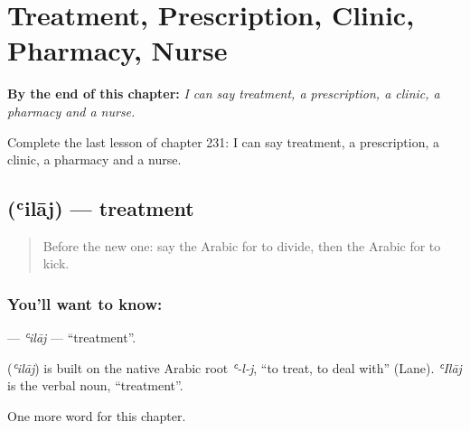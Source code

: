 
\chapter{Treatment, Prescription, Clinic, Pharmacy, Nurse}
\label{ch:ar-treatment-prescription-clinic-pharmacy-nurse}

\begin{chapteropening}
\textbf{By the end of this chapter:} \emph{I can say treatment, a prescription, a clinic, a pharmacy and a nurse.}

Complete the last lesson of chapter 231: I can say treatment, a prescription, a clinic, a pharmacy and a nurse.
\end{chapteropening}

\section[\texorpdfstring{\ar{علاج} (ʿilāj)}{علاج (ʿilāj)}]{ (ʿilāj) — treatment}

\label{lesson:AR-C231-ilaj}



\begin{quote}
Before the new one: say the Arabic for to divide, then the Arabic for to kick.
\end{quote}

\subsection*{You'll want to know: }
\textbf{} — \emph{ʿilāj} — \textquotedblleft{}treatment\textquotedblright{}.

\begin{cousinweb}
\textbf{} (\emph{ʿilāj}) is built on the native Arabic root \emph{ʿ-l-j}, \textquotedblleft{}to treat, to deal with\textquotedblright{} (Lane). \emph{ʿIlāj} is the verbal noun, \textquotedblleft{}treatment\textquotedblright{}.
\end{cousinweb}

\begin{grammarlens}[title={What you've built}]
One more word for this chapter.
\end{grammarlens}

